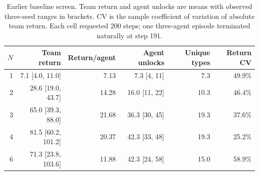 \begin{table}[t]
\centering
\small
\setlength{\tabcolsep}{4.5pt}
\begin{tabular}{rrrrrr}
\toprule
$N$ & Team return & Return/agent & Agent unlocks & Unique types & Return CV \\
\midrule
1 & 7.1 [4.0, 11.0] & 7.13 & 7.3 [4, 11] & 7.3 & 49.9\% \\
2 & 28.6 [19.0, 43.7] & 14.28 & 16.0 [11, 22] & 10.3 & 46.4\% \\
3 & 65.0 [39.3, 88.0] & 21.68 & 36.3 [30, 45] & 19.3 & 37.6\% \\
4 & 81.5 [60.2, 101.2] & 20.37 & 42.3 [33, 48] & 19.3 & 25.2\% \\
6 & 71.3 [23.8, 103.6] & 11.88 & 42.3 [24, 58] & 15.0 & 58.9\% \\
\bottomrule
\end{tabular}
\caption{Earlier baseline screen. Team return and agent unlocks are means with observed three-seed ranges in brackets. CV is the sample coefficient of variation of absolute team return. Each cell requested 200 steps; one three-agent episode terminated naturally at step 191.}
\label{tab:low-scale}
\end{table}
